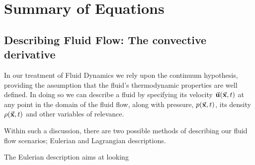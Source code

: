 \chapter{Summary of Equations}
\section{Describing Fluid Flow: The convective derivative}

In our treatment of Fluid Dynamics we rely upon the continuum hypothesis, providing the assumption that the fluid's thermodynamic properties are well defined. In doing so we can describe a fluid by specifying its velocity $\vec{\mathbf{u}}(\vec{\mathbf{x}}, t)$ at any point in the domain of the fluid flow, along with pressure, $p (\vec{\mathbf{x}}, t)$, its density $\rho (\vec{\mathbf{x}}, t)$ and other variables of relevance.

Within such a discussion, there are two possible methods of describing our fluid flow scenarios; Eulerian and Lagrangian descriptions. 

The Eulerian description aims at looking  